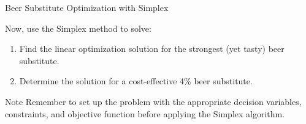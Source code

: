 \documentclass[
    NAME={Dr. Helga Ingimundardóttir},
    EMAIL={helgaingim@hi.is},
    FACULTY={Industrial Engineering},
    TITLE={Linear Optimization},
    SUBTITLE={Fundamentals and Applications},
    SEMINAR={VÉL113F},
    DATE={Design and Optimization}
]{HI-latex/hi-beamer}
\begin{document}
    \begin{frame}[allowframebreaks]{Beer Substitute Optimization with Simplex}
        \label{example:beer:simplex}
        \begin{example}
            Now, use the Simplex method to solve:
            \begin{enumerate}
                \item Find the linear optimization solution for the strongest (yet tasty) beer substitute.
                \item Determine the solution for a cost-effective 4\% beer substitute.
            \end{enumerate}
        \end{example}

        \begin{alertblock}{Note}
            Remember to set up the problem with the appropriate decision variables, constraints, and objective function
            before applying the Simplex algorithm.
        \end{alertblock}

    \end{frame}
\end{document}
